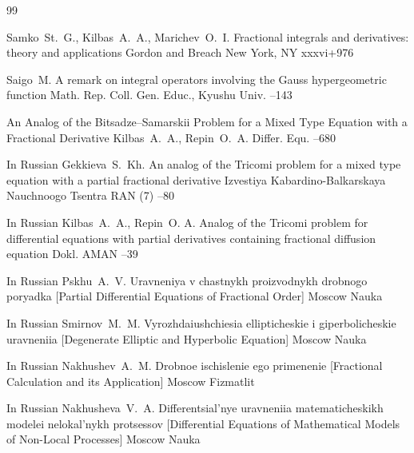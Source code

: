 \begin{thebibliography}{99}

\by Samko~St.~G., Kilbas~A.~A., Marichev~O.~I.
\book Fractional integrals and derivatives: theory and applications
\publ Gordon and Breach
\publaddr New York, NY
\totalpages xxxvi+976 

\by Saigo~M.
\paper A remark on integral operators involving the Gauss hypergeometric function
\jour  Math. Rep. Coll. Gen. Educ., Kyushu Univ.
--143

\paper An Analog of the Bitsadze–Samarskii Problem for a Mixed Type Equation with a Fractional Derivative
\by Kilbas~A.~A., Repin~O.~A.
\jour Differ. Equ.
--680

\lang In Russian
\by Gekkieva~S.~Kh.
\paper An analog of the Tricomi problem for a mixed type equation with a partial fractional derivative
\jour  Izvestiya Kabardino-Balkarskaya Nauchnoogo Tsentra RAN
(7)
–80 

\lang In Russian
\by  Kilbas~A.~A., Repin~O. A.
\paper Analog of the Tricomi problem for differential equations with partial derivatives containing fractional diffusion equation
\jour Dokl. AMAN
--39 



\lang In Russian
\by Pskhu~A.~V.
\book Uravneniya v chastnykh proizvodnykh drobnogo poryadka \rm [Partial Differential Equations of Fractional Order]
\publaddr Moscow
\publ Nauka


\lang In Russian
\by Smirnov~M.~M.
\book Vyrozhdaiushchiesia ellipticheskie i giperbolicheskie uravneniia  \rm [Degenerate Elliptic and Hyperbolic Equation]
\publaddr Moscow
\publ Nauka 

\lang In Russian
\by Nakhushev~A.~M.
\book Drobnoe ischislenie ego primenenie \rm [Fractional Calculation and its Application]
\publaddr Moscow
\publ Fizmatlit

\lang In Russian
\by Nakhusheva~V.~A.
\book Differentsial'nye uravneniia matematicheskikh modelei nelokal'nykh protsessov \rm [Differential Equations of Mathematical Models of Non-Local Processes]
\publaddr Moscow
\publ Nauka

\end{thebibliography}

\nopagenumber

\newpage

%

